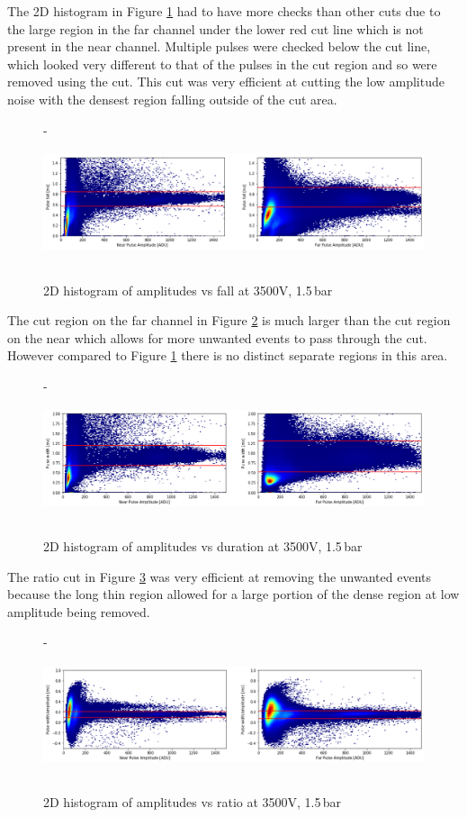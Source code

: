 \documentclass[a4paper]{article}
\begin{document}
\noindent The 2D histogram in Figure \ref{fig:2fall} had to have more checks than other cuts due to the large region in the far channel under the lower red cut line which is not present in the near channel. Multiple pulses were checked below the cut line, which looked very different to that of the pulses in the cut region and so were removed using the cut. This cut was very efficient at cutting the low amplitude noise with the densest region falling outside of the cut area.
\begin{figure}[H]-
\centering
\includegraphics[height=3.7cm]{uk24n002_fall.png}
\caption{2D histogram of amplitudes vs fall at 3500V, 1.5\,bar}
\label{fig:2fall}
\end{figure}
\noindent The cut region on the far channel in Figure \ref{fig:2dur} is much larger than the cut region on the near which allows for more unwanted events to pass through the cut. However compared to Figure \ref{fig:2fall} there is no distinct separate regions in this area.
\begin{figure}[H]-
\centering
\includegraphics[height=3.7cm]{uk24n002_dur.png}
\caption{2D histogram of amplitudes vs duration at 3500V, 1.5\,bar}
\label{fig:2dur}
\end{figure}
\noindent The ratio cut in Figure \ref{fig:2len} was very efficient at removing the unwanted events because the long thin region allowed for a large portion of the dense region at low amplitude being removed.
\begin{figure}[H]-
    \centering
    \includegraphics[height=3.7cm]{uk24n002_len.png}
    \caption{2D histogram of amplitudes vs ratio at 3500V, 1.5\,bar}
    \label{fig:2len}
\end{figure}
\end{document}
